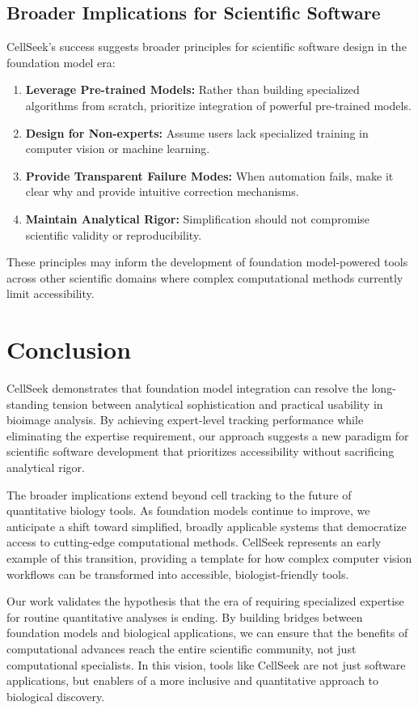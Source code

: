 \documentclass[12pt]{article}
\begin{document}
\subsection{Broader Implications for Scientific Software}

CellSeek's success suggests broader principles for scientific software design in the foundation model era:

\begin{enumerate}
\item \textbf{Leverage Pre-trained Models:} Rather than building specialized algorithms from scratch, prioritize integration of powerful pre-trained models.
\item \textbf{Design for Non-experts:} Assume users lack specialized training in computer vision or machine learning.
\item \textbf{Provide Transparent Failure Modes:} When automation fails, make it clear why and provide intuitive correction mechanisms.
\item \textbf{Maintain Analytical Rigor:} Simplification should not compromise scientific validity or reproducibility.
\end{enumerate}

These principles may inform the development of foundation model-powered tools across other scientific domains where complex computational methods currently limit accessibility.

\section{Conclusion}

CellSeek demonstrates that foundation model integration can resolve the long-standing tension between analytical sophistication and practical usability in bioimage analysis. By achieving expert-level tracking performance while eliminating the expertise requirement, our approach suggests a new paradigm for scientific software development that prioritizes accessibility without sacrificing analytical rigor.

The broader implications extend beyond cell tracking to the future of quantitative biology tools. As foundation models continue to improve, we anticipate a shift toward simplified, broadly applicable systems that democratize access to cutting-edge computational methods. CellSeek represents an early example of this transition, providing a template for how complex computer vision workflows can be transformed into accessible, biologist-friendly tools.

Our work validates the hypothesis that the era of requiring specialized expertise for routine quantitative analyses is ending. By building bridges between foundation models and biological applications, we can ensure that the benefits of computational advances reach the entire scientific community, not just computational specialists. In this vision, tools like CellSeek are not just software applications, but enablers of a more inclusive and quantitative approach to biological discovery.
\end{document}
